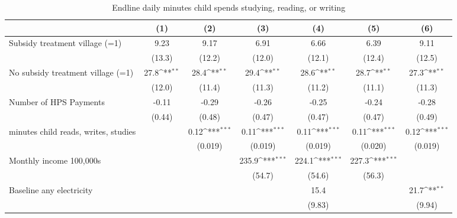 \begin{table}[htbp]\centering
\def\sym#1{\ifmmode^{#1}\else\(^{#1}\)\fi}
\caption{Endline daily minutes child spends studying, reading, or writing}
\begin{tabular*}{1\hsize}{@{\hskip\tabcolsep\extracolsep\fill}l*{6}{c}}
\toprule
                &\multicolumn{1}{c}{(1)}         &\multicolumn{1}{c}{(2)}         &\multicolumn{1}{c}{(3)}         &\multicolumn{1}{c}{(4)}         &\multicolumn{1}{c}{(5)}         &\multicolumn{1}{c}{(6)}         \\
\midrule
Subsidy treatment village (=1)&     9.23         &     9.17         &     6.91         &     6.66         &     6.39         &     9.11         \\
                &   (13.3)         &   (12.2)         &   (12.0)         &   (12.1)         &   (12.4)         &   (12.5)         \\
No subsidy treatment village (=1)&     27.8\sym{**} &     28.4\sym{**} &     29.4\sym{**} &     28.6\sym{**} &     28.7\sym{**} &     27.3\sym{**} \\
                &   (12.0)         &   (11.4)         &   (11.3)         &   (11.2)         &   (11.1)         &   (11.3)         \\
Number of HPS Payments&    -0.11         &    -0.29         &    -0.26         &    -0.25         &    -0.24         &    -0.28         \\
                &   (0.44)         &   (0.48)         &   (0.47)         &   (0.47)         &   (0.47)         &   (0.49)         \\
minutes child reads, writes, studies&                  &     0.12\sym{***}&     0.11\sym{***}&     0.11\sym{***}&     0.11\sym{***}&     0.12\sym{***}\\
                &                  &  (0.019)         &  (0.019)         &  (0.019)         &  (0.020)         &  (0.019)         \\
Monthly income 100,000s&                  &                  &    235.9\sym{***}&    224.1\sym{***}&    227.3\sym{***}&                  \\
                &                  &                  &   (54.7)         &   (54.6)         &   (56.3)         &                  \\
Baseline any electricity&                  &                  &                  &     15.4         &                  &     21.7\sym{**} \\
                &                  &                  &                  &   (9.83)         &                  &   (9.94)         \\

\end{tabular*}
\end{table}
